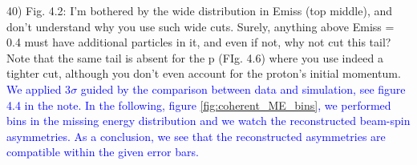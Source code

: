 40) Fig. 4.2: I'm bothered by the wide distribution in Emiss (top middle), and 
don't understand why you use such wide cuts. Surely, anything above Emiss = 0.4 
must have additional particles in it, and even if not, why not cut this tail?  
Note that the same tail is absent for the p (FIg. 4.6) where you use indeed a 
tighter cut, although you don't even account for the proton's initial 
momentum.\\
\textcolor{blue}{ We applied 3$\sigma$ guided by the comparison between data 
and simulation, see figure 4.4 in the note. In the following, figure 
\ref{fig:coherent_ME_bins}, we performed bins in the missing energy 
distribution and we watch the reconstructed beam-spin asymmetries. As a 
conclusion, we see that the reconstructed asymmetries are compatible within the 
given error bars.} \\

